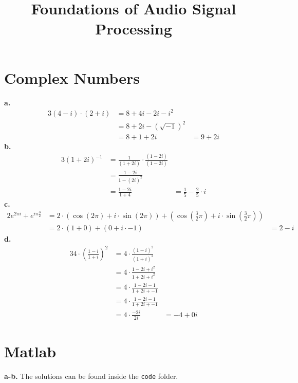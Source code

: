 \documentclass[12pt]{article}
\title{Foundations of Audio Signal Processing\\ \ass}
\author{\auth}
\begin{document}
	\maketitle
	\section{Complex Numbers}
	\textbf{a.}
	\begin{alignat*}{3}
		(4 − i) \cdot (2 + i) &= 8 + 4i - 2i - i^2\\
		&= 8 + 2i - (\sqrt{-1})^2\\
		&= 8 + 1 + 2i &= 9 + 2i
	\end{alignat*}
	\textbf{b.}
	\begin{alignat*}{3}
	(1 + 2i)^{-1} &= \frac{1}{(1 + 2i)} \cdot \frac{(1 - 2i)}{(1 - 2i)}\\
	&= \frac{1 - 2i}{1 - (2i)^2}\\
	&= \frac{1 - 2i}{1 + 4} &= \frac{1}{5} - \frac{2}{5} \cdot i
	\end{alignat*}
	\textbf{c.}
	\begin{alignat*}
	2 e^{2 \pi i} + e^{i \pi \frac{3}{2}} &= 2 \cdot (\cos(2 \pi) + i \cdot \sin(2\pi)) + (\cos(\frac{3}{2}\pi) + i \cdot \sin(\frac{3}{2}\pi))\\
	&= 2 \cdot (1 + 0) + (0 + i \cdot -1) &= 2 - i
	\end{alignat*}
	\textbf{d.}
	\begin{alignat*}{3}
	4 \cdot \left(\frac{1 - i}{1 + i}\right)^2 &= 4 \cdot \frac{(1 - i)^2}{(1 + i)^2}\\
	&= 4 \cdot \frac{1 -2i + i^2}{1 + 2i + i^2}\\
	&= 4 \cdot \frac{1 -2i - 1}{1 + 2i + -1}\\
	&= 4 \cdot \frac{1 -2i - 1}{1 + 2i + -1}\\
	&= 4 \cdot \frac{-2i}{2i} &= - 4 + 0 i
	\end{alignat*}
	\section{Matlab}
	\textbf{a-b.} The solutions can be found inside the \texttt{code} folder.\\
	
\end{document}
